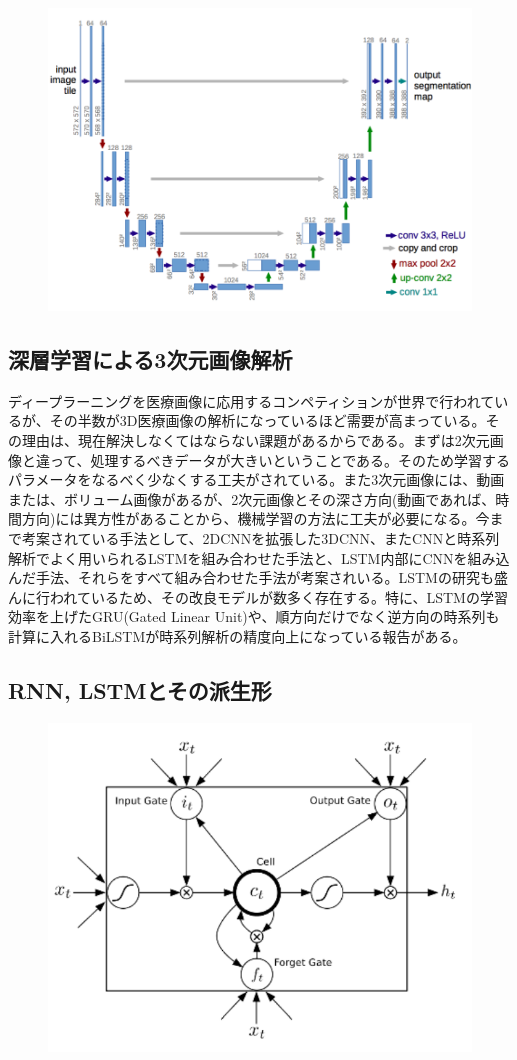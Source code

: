 \begin{figure}[h]
\centering
\includegraphics[width=0.7\linewidth]{fig/unet.png}
\end{figure}

\subsection*{深層学習による3次元画像解析}
ディープラーニングを医療画像に応用するコンペティションが世界で行われているが、その半数が3D医療画像の解析になっているほど需要が高まっている。その理由は、現在解決しなくてはならない課題があるからである。まずは2次元画像と違って、処理するべきデータが大きいということである。そのため学習するパラメータをなるべく少なくする工夫がされている。また3次元画像には、動画または、ボリューム画像があるが、2次元画像とその深さ方向(動画であれば、時間方向)には異方性があることから、機械学習の方法に工夫が必要になる。今まで考案されている手法として、2DCNNを拡張した3DCNN、またCNNと時系列解析でよく用いられるLSTMを組み合わせた手法と、LSTM内部にCNNを組み込んだ手法、それらをすべて組み合わせた手法が考案されいる。LSTMの研究も盛んに行われているため、その改良モデルが数多く存在する。特に、LSTMの学習効率を上げたGRU(Gated Linear Unit)や、順方向だけでなく逆方向の時系列も計算に入れるBiLSTMが時系列解析の精度向上になっている報告がある。
\subsection*{RNN, LSTMとその派生形}
\begin{figure}[h]
\includegraphics[width=0.7\linewidth]{fig/lstm.png}
\end{figure}

